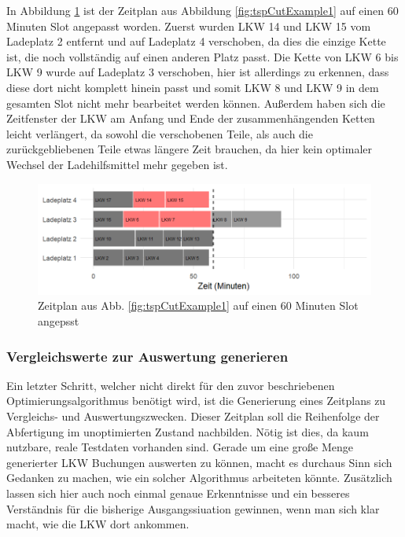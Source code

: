 In Abbildung \ref{fig:tspCutExample2} ist der Zeitplan aus Abbildung \ref{fig:tspCutExample1} auf einen 60 Minuten Slot angepasst worden. Zuerst wurden LKW 14 und LKW 15 vom Ladeplatz 2 entfernt und auf Ladeplatz 4 verschoben, da dies die einzige Kette ist, die noch vollständig auf einen anderen Platz passt. Die Kette von LKW 6 bis LKW 9 wurde auf Ladeplatz 3 verschoben, hier ist allerdings zu erkennen, dass diese dort nicht komplett hinein passt und somit LKW 8 und LKW 9 in dem gesamten Slot nicht mehr bearbeitet werden können. Außerdem haben sich die Zeitfenster der LKW am Anfang und Ende der zusammenhängenden Ketten leicht verlängert, da sowohl die verschobenen Teile, als auch die zurückgebliebenen Teile etwas längere Zeit brauchen, da hier kein optimaler Wechsel der Ladehilfsmittel mehr gegeben ist.

\begin{figure}[H]
    \centering
    \includegraphics[width=\textwidth]{images/timelines/timelineTspCutExample2.png}
    \caption{Zeitplan aus Abb. \ref{fig:tspCutExample1} auf einen 60 Minuten Slot angepsst}
    \label{fig:tspCutExample2}
\end{figure}


\subsubsection{Vergleichswerte zur Auswertung generieren}
\label{sec:konzeptTspVergleichswerte}


Ein letzter Schritt, welcher nicht direkt für den zuvor beschriebenen Optimierungsalgorithmus benötigt wird, ist die Generierung eines Zeitplans zu Vergleichs- und Auswertungszwecken. Dieser Zeitplan soll die Reihenfolge der Abfertigung im unoptimierten Zustand nachbilden. Nötig ist dies, da kaum nutzbare, reale Testdaten vorhanden sind. Gerade um eine große Menge generierter LKW Buchungen auswerten zu können, macht es durchaus Sinn sich Gedanken zu machen, wie ein solcher Algorithmus arbeiteten könnte. Zusätzlich lassen sich hier auch noch einmal genaue Erkenntnisse und ein besseres Verständnis für die bisherige Ausgangssiuation gewinnen, wenn man sich klar macht, wie die LKW dort ankommen.

